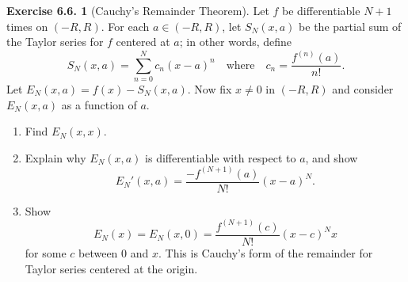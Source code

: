 \documentclass[12pt]{article}
\theoremstyle{definition}
\theoremstyle{exercise}
\newtheorem{exercise}{Exercise 6.6.}
\theoremstyle{solution}
\begin{document}
\begin{exercise}[Cauchy's Remainder Theorem]
\label{ex:9}
    Let \( f \) be differentiable \( N + 1 \) times on \( (-R, R) \). For each \( a \in (-R, R) \), let \( S_N(x, a) \) be the partial sum of the Taylor series for \( f \) centered at \( a \); in other words, define
    \[
        S_N(x, a) = \sum_{n=0}^N c_n (x - a)^n \quad \text{where} \quad c_n = \frac{f^{(n)}(a)}{n!}.
    \]
    Let \( E_N(x, a) = f(x) - S_N(x, a) \). Now fix \( x \neq 0 \) in \( (-R, R) \) and consider \( E_N(x, a) \) as a function of \( a \).
    \begin{enumerate}
        \item Find \( E_N(x, x) \).

        \item Explain why \( E_N(x, a) \) is differentiable with respect to \( a \), and show
        \[
            E_N'(x, a) = \frac{-f^{(N + 1)}(a)}{N!} (x - a)^N.
        \]

        \item Show
        \[
            E_N(x) = E_N(x, 0) = \frac{f^{(N + 1)}(c)}{N!} (x - c)^N x
        \]
        for some \( c \) between 0 and \( x \). This is Cauchy's form of the remainder for Taylor series centered at the origin.
    \end{enumerate}
\end{exercise}
\end{document}
